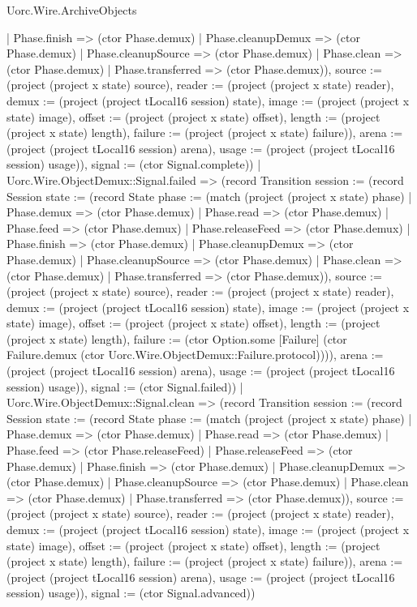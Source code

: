 \begin{lexlean}{Uorc.Wire.ArchiveObjects}
\begin{semanticmodule}
{{{{            | Phase.finish => (ctor Phase.demux)
            | Phase.cleanupDemux => (ctor Phase.demux)
            | Phase.cleanupSource => (ctor Phase.demux)
            | Phase.clean => (ctor Phase.demux)
            | Phase.transferred => (ctor Phase.demux)), source := (project (project x state) source), reader := (project (project x state) reader), demux := (project (project tLocal16 session) state), image := (project (project x state) image), offset := (project (project x state) offset), length := (project (project x state) length), failure := (project (project x state) failure)}), arena := (project (project tLocal16 session) arena), usage := (project (project tLocal16 session) usage)}), signal := (ctor Signal.complete)})
          | Uorc.Wire.ObjectDemux::Signal.failed => (record Transition {session := (record Session {state := (record State {phase := (match (project (project x state) phase)
            | Phase.demux => (ctor Phase.demux)
            | Phase.read => (ctor Phase.demux)
            | Phase.feed => (ctor Phase.demux)
            | Phase.releaseFeed => (ctor Phase.demux)
            | Phase.finish => (ctor Phase.demux)
            | Phase.cleanupDemux => (ctor Phase.demux)
            | Phase.cleanupSource => (ctor Phase.demux)
            | Phase.clean => (ctor Phase.demux)
            | Phase.transferred => (ctor Phase.demux)), source := (project (project x state) source), reader := (project (project x state) reader), demux := (project (project tLocal16 session) state), image := (project (project x state) image), offset := (project (project x state) offset), length := (project (project x state) length), failure := (ctor Option.some [Failure] (ctor Failure.demux (ctor Uorc.Wire.ObjectDemux::Failure.protocol)))}), arena := (project (project tLocal16 session) arena), usage := (project (project tLocal16 session) usage)}), signal := (ctor Signal.failed)})
          | Uorc.Wire.ObjectDemux::Signal.clean => (record Transition {session := (record Session {state := (record State {phase := (match (project (project x state) phase)
            | Phase.demux => (ctor Phase.demux)
            | Phase.read => (ctor Phase.demux)
            | Phase.feed => (ctor Phase.releaseFeed)
            | Phase.releaseFeed => (ctor Phase.demux)
            | Phase.finish => (ctor Phase.demux)
            | Phase.cleanupDemux => (ctor Phase.demux)
            | Phase.cleanupSource => (ctor Phase.demux)
            | Phase.clean => (ctor Phase.demux)
            | Phase.transferred => (ctor Phase.demux)), source := (project (project x state) source), reader := (project (project x state) reader), demux := (project (project tLocal16 session) state), image := (project (project x state) image), offset := (project (project x state) offset), length := (project (project x state) length), failure := (project (project x state) failure)}), arena := (project (project tLocal16 session) arena), usage := (project (project tLocal16 session) usage)}), signal := (ctor Signal.advanced)})
}
\end{semanticmodule}
\end{lexlean}
